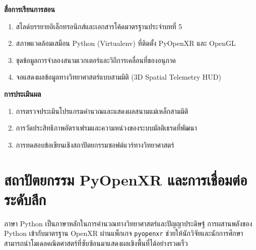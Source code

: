 \noindent\textbf{สื่อการเรียนการสอน}
\begin{enumerate}
    \item สไลด์บรรยายอิเล็กทรอนิกส์และเอกสารโค้ดมาตรฐานประจำบทที่ 5
    \item สภาพแวดล้อมเสมือน Python (Virtualenv) ที่ติดตั้ง PyOpenXR และ OpenGL
    \item ชุดข้อมูลการจำลองสนามเวกเตอร์และวิถีการเคลื่อนที่ของอนุภาค
    \item จอแสดงผลข้อมูลทางวิทยาศาสตร์แบบสามมิติ (3D Spatial Telemetry HUD)
\end{enumerate}

\noindent\textbf{การประเมินผล}
\begin{enumerate}
    \item การตรวจประเมินโปรแกรมคำนวณและแสดงผลสนามแม่เหล็กสามมิติ
    \item การวัดประสิทธิภาพอัตราเฟรมและความหน่วงของระบบมัลติเธรดที่พัฒนา
    \item การทดสอบข้อเขียนเชิงสถาปัตยกรรมซอฟต์แวร์ทางวิทยาศาสตร์
\end{enumerate}

\newpage

\section{สถาปัตยกรรม PyOpenXR และการเชื่อมต่อระดับลึก}

ภาษา Python เป็นภาษาหลักในการคำนวณทางวิทยาศาสตร์และปัญญาประดิษฐ์ การผสานพลังของ Python เข้ากับมาตรฐาน OpenXR ผ่านแพ็กเกจ \texttt{pyopenxr} ช่วยให้นักวิจัยและนักการศึกษาสามารถนำโมเดลคณิตศาสตร์ที่ซับซ้อนมาแสดงผลเชิงพื้นที่ได้อย่างรวดเร็ว

